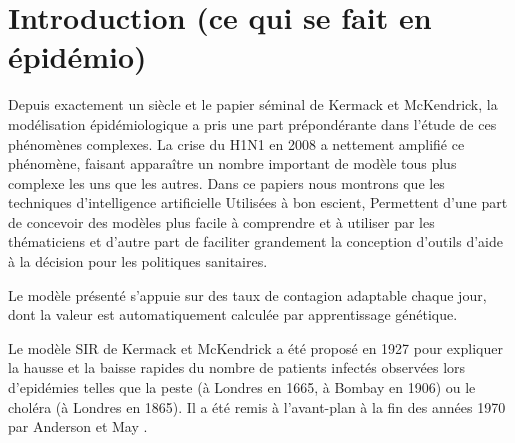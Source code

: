 \documentclass[review]{elsarticle}
\begin{document}
\linenumbers

\section{Introduction (ce qui se fait en épidémio)}

Depuis exactement un siècle et le papier séminal de Kermack et
McKendrick, la modélisation épidémiologique a pris une part
prépondérante dans l’étude de ces phénomènes complexes. La crise du
H1N1 en 2008 a nettement amplifié ce phénomène, faisant apparaître un
nombre important de modèle tous plus complexe les uns que les
autres. Dans ce papiers nous montrons que les techniques
d’intelligence artificielle Utilisées à bon escient, Permettent d’une
part de concevoir des modèles plus facile à comprendre et à utiliser
par les thématiciens et d’autre part de faciliter grandement la
conception d’outils d’aide à la décision pour les politiques
sanitaires.


Le modèle présenté s'appuie sur des taux de contagion
adaptable chaque jour, dont la valeur est automatiquement calculée par
apprentissage génétique.



Le modèle SIR de Kermack et McKendrick \cite{} a été proposé en 1927 pour expliquer la hausse et la baisse rapides du nombre de patients infectés observées lors d'epidémies telles que la peste (à Londres en 1665, à Bombay en 1906) ou le choléra (à Londres en 1865). Il a été remis à l’avant-plan à la fin des années 1970 par Anderson et May \cite{}.


\bigskip


\hfill {} \hfill \
\end{document}
